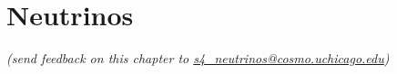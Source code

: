  
\chapter{Neutrinos}


\def\beq{\begin{equation}}
\def\eeq{\end{equation}}

\def\bea{\begin{eqnarray}}
\def\eea{\end{eqnarray}}

\def\Neff{N_{\rm eff}}
\def\Nf{N_{\rm eff}}
\def\gs{g_{\star}}
\def\Mpl{M_{\rm P}}
\newcommand{\nucl}[3]{ \ensuremath{ \phantom{\ensuremath{^{#1}_{#2}}} \llap{\ensuremath{^{#1}}} \llap{\ensuremath{_{\rule{0pt}{.75em}#2}}} \mbox{#3} } }


\def\lsim{\raise-.75ex\hbox{$\buildrel<\over\sim$}}

\begin{center}
{\small \it (send feedback on this chapter to \href{mailto:s4_neutrinos@cosmo.uchicago.edu}{s4\_neutrinos@cosmo.uchicago.edu})}
\end{center}

